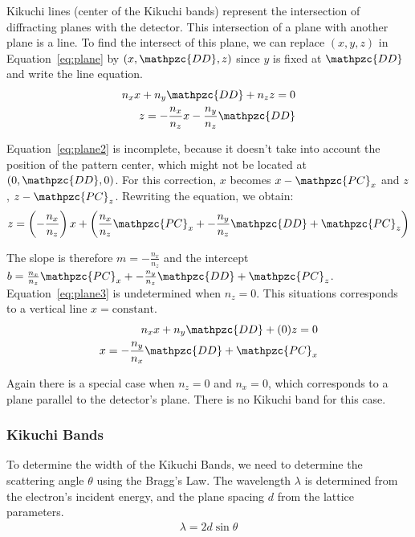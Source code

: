\documentclass[letterpaper]{article}
\newcommand{\var}[1]{\mathpzc{#1}}
\begin{document}
	Kikuchi lines (center of the Kikuchi bands) represent the intersection of diffracting planes with the detector.  
	This intersection of a plane with another plane is a line.
	To find the intersect of this plane, we can replace $(x,y,z)$ in Equation~\ref{eq:plane} by $(x, \var{DD}, z)$ since $y$ is fixed at $\var{DD}$ and write the line equation.
	\begin{eqnarray}
		n_x x + n_y \var{DD} + n_z z = 0 \\\nonumber
		z = -\frac{n_x}{n_z}x - \frac{n_y}{n_z}\var{DD}
		\label{eq:plane2}
	\end{eqnarray}
	
	Equation~\ref{eq:plane2} is incomplete, because it doesn't take into account the position of the pattern center, which might not be located at $(0,\var{DD},0)$. 
	For this correction, $x$ becomes $x-\var{PC}_x$ and $z$, $z-\var{PC}_z$.
	Rewriting the equation, we obtain:
	\begin{eqnarray}
		z = \left(-\frac{n_x}{n_z}\right)x + \left(\frac{n_x}{n_z}\var{PC}_x + - \frac{n_y}{n_z}\var{DD} + \var{PC}_z\right)
		\label{eq:plane3}
	\end{eqnarray}
	
	The slope is therefore $m=-\frac{n_x}{n_z}$ and the intercept $b=\frac{n_x}{n_z}\var{PC}_x + - \frac{n_y}{n_z}\var{DD} + \var{PC}_z$. 
	Equation~\ref{eq:plane3} is undetermined when $n_z = 0$. 
	This situations corresponds to a vertical line $x = \text{constant}$.
	\begin{eqnarray}
		n_x x + n_y \var{DD} + (0) z = 0 \\\nonumber
		x = -\frac{n_y}{n_x}\var{DD} + \var{PC}_x
		\label{eq:plane4}
	\end{eqnarray}
	
	Again there is a special case when $n_z = 0$ and $n_x = 0$, which corresponds to a plane parallel to the detector's plane. 
	There is no Kikuchi band for this case.
	
	\subsubsection{Kikuchi Bands}
	To determine the width of the Kikuchi Bands, we need to determine the scattering angle $\theta$ using the Bragg's Law. The wavelength $\lambda$ is determined from the electron's incident energy, and the plane spacing $d$ from the lattice parameters.
	\begin{eqnarray}
		\lambda = 2d\sin\theta
		\label{eq:bragg}
	\end{eqnarray}
	
\end{document}
